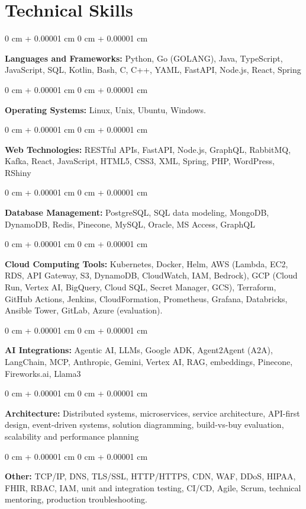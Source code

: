 \documentclass[10pt, letterpaper]{article}
\newenvironment{onecolentry}{
    \begin{adjustwidth}{
        0 cm + 0.00001 cm
    }{
        0 cm + 0.00001 cm
    }
}{
    \end{adjustwidth}
} %
\begin{document}
    \section{Technical Skills}
    \vspace{2 pt }
    \begin{onecolentry}
    \textbf{Languages and Frameworks:} Python, Go (GOLANG), Java, TypeScript, JavaScript, SQL, Kotlin, Bash, C, C++, YAML, FastAPI, Node.js, React, Spring
    \end{onecolentry}
    \begin{onecolentry}
        \textbf{Operating Systems:} Linux, Unix, Ubuntu, Windows.
    \end{onecolentry}
    \begin{onecolentry}
         \textbf{Web Technologies:} RESTful APIs, FastAPI, Node.js, GraphQL, RabbitMQ, Kafka, React, JavaScript, HTML5, CSS3, XML, Spring, PHP, WordPress, RShiny
    \end{onecolentry}
    \begin{onecolentry}
        \textbf{Database Management:} PostgreSQL, SQL data modeling, MongoDB, DynamoDB, Redis, Pinecone, MySQL, Oracle, MS Access, GraphQL
    \end{onecolentry}
    \begin{onecolentry}
        \textbf{Cloud Computing Tools:}
Kubernetes, Docker, Helm, AWS (Lambda, EC2, RDS, API Gateway, S3, DynamoDB, CloudWatch, IAM, Bedrock), GCP (Cloud Run, Vertex AI, BigQuery, Cloud SQL, Secret Manager, GCS), Terraform, GitHub Actions, Jenkins, CloudFormation, Prometheus, Grafana, Databricks, Ansible Tower, GitLab, Azure (evaluation).
    \end{onecolentry}
    \begin{onecolentry}
         \textbf{AI Integrations:} Agentic AI, LLMs, Google ADK, Agent2Agent (A2A), LangChain, MCP, Anthropic, Gemini, Vertex AI, RAG, embeddings, Pinecone, Fireworks.ai, Llama3
    \end{onecolentry}
    \begin{onecolentry}
        \textbf{Architecture:} Distributed systems, microservices, service architecture, API-first design, event-driven systems, solution diagramming, build-vs-buy evaluation, scalability and performance planning
    \end{onecolentry}
        \begin{onecolentry}
     \textbf{Other:} TCP/IP, DNS, TLS/SSL, HTTP/HTTPS, CDN, WAF, DDoS, HIPAA, FHIR, RBAC, IAM, unit and integration testing, CI/CD, Agile, Scrum, technical mentoring, production troubleshooting.
    \end{onecolentry}
\end{document}
